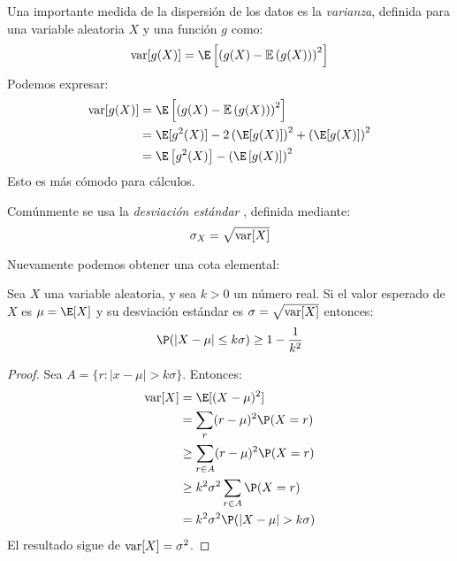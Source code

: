   Una importante medida
  de la dispersión de los datos es la \emph{varianza},%
  definida para una variable aleatoria \(X\)
  y una función \(g\) como:
  \begin{equation}
    \label{eq:definition-variance}
    \var[g(X)]
      = \E
	  \left[
	     \left( g(X) - \mathbb{E}\left( g(X) \right) \right)^2
	  \right]
  \end{equation}
  Podemos expresar:
  \begin{align}
    \var[g(X)]
      &= \E
	   \left[
	     \left( g(X) - \mathbb{E}\left( g(X) \right) \right)^2
	   \right]
	     \notag \\
      &= \E[g^2(X)]
	   - 2 \left(\E[g(X)] \right)^2
	   + \left(\E[g(X)] \right)^2
	     \notag \\
      &= \E\left[ g^2(X) \right]
	   - \left(\E\left[ g(X) \right] \right)^2
	     \label{eq:compute-variance}
  \end{align}
  Esto es más cómodo para cálculos.

  Comúnmente se usa la \emph{desviación estándar}%
    ,
  definida mediante:
  \begin{equation}
    \label{eq:standard-deviation-def}
    \sigma_X
      = \sqrt{\operatorname{var}[X]}
  \end{equation}

  Nuevamente podemos obtener una cota elemental:
  \begin{theorem}
    \label{theo:Chebychev-inequality}
    Sea \(X\) una variable aleatoria,
    y sea \(k > 0\) un número real.
    Si el valor esperado de \(X\) es \(\mu = \E[X]\)
    y su desviación estándar es \(\sigma = \sqrt{\operatorname{var}[X]}\)
    entonces:
    \begin{equation}
      \label{eq:Chebychev-inequality}
      \P(\lvert X - \mu \rvert \le k \sigma)
	\ge 1 - \frac{1}{k^2}
    \end{equation}
  \end{theorem}
  \begin{proof}
    Sea \(A = \{ r \colon \lvert x - \mu \rvert > k \sigma \}\).
    Entonces:
    \begin{align*}
      \var[X]
	&=   \E[(X - \mu)^2] \\
	&=   \sum_r (r - \mu)^2 \P(X = r) \\
	&\ge \sum_{r \in A} (r - \mu)^2 \P(X = r) \\
	&\ge k^2 \sigma^2 \sum_{r \in A} \P(X = r) \\
	&=   k^2 \sigma^2 \P(\lvert X - \mu \rvert > k \sigma)
    \end{align*}
    El resultado sigue de \(\operatorname{var}[X] = \sigma^2\).
  \end{proof}

